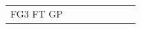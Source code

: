 \documentclass{article}
\begin{document}
\begin{table}[H]
{\begin{tabular}{lrrrrrrr}
FG3%
FT%
GP%

\end{tabular}}
\end{table}
\end{document}
